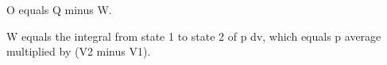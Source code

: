 O equals Q minus W.  

W equals the integral from state 1 to state 2 of p dv, which equals p average multiplied by (V2 minus V1).